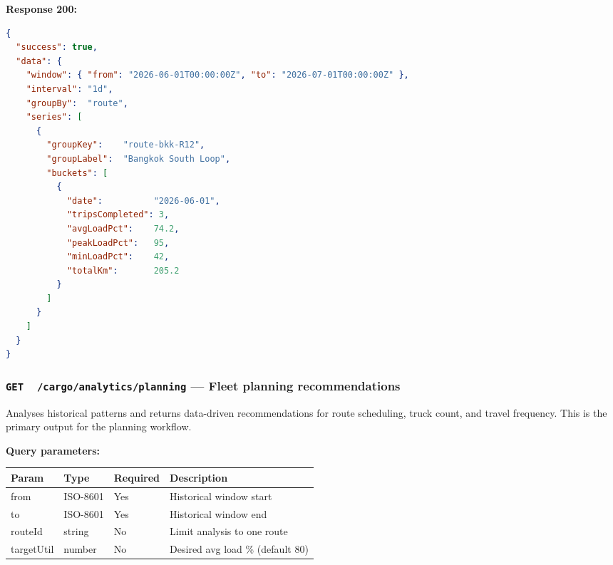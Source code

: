 \documentclass{article}
\newcommand{\GET}{\colorbox{evblue!20}{\texttt{\textbf{\color{evblue}GET}}}}
\begin{document}
\textbf{Response 200:}
\begin{lstlisting}[language=json, caption=Utilization analytics response]
{
  "success": true,
  "data": {
    "window": { "from": "2026-06-01T00:00:00Z", "to": "2026-07-01T00:00:00Z" },
    "interval": "1d",
    "groupBy":  "route",
    "series": [
      {
        "groupKey":    "route-bkk-R12",
        "groupLabel":  "Bangkok South Loop",
        "buckets": [
          {
            "date":          "2026-06-01",
            "tripsCompleted": 3,
            "avgLoadPct":    74.2,
            "peakLoadPct":   95,
            "minLoadPct":    42,
            "totalKm":       205.2
          }
        ]
      }
    ]
  }
}
\end{lstlisting}

\subsubsection{\GET\ \ \texttt{/cargo/analytics/planning} --- Fleet planning recommendations}

Analyses historical patterns and returns data-driven recommendations for
route scheduling, truck count, and travel frequency. This is the primary
output for the planning workflow.

\textbf{Query parameters:}

\begin{center}
\begin{tabular}{>{\ttfamily}llll}
\toprule
\textbf{Param} & \textbf{Type} & \textbf{Required} & \textbf{Description}\\
\midrule
from       & ISO-8601 & Yes & Historical window start\\
to         & ISO-8601 & Yes & Historical window end\\
routeId    & string   & No  & Limit analysis to one route\\
targetUtil & number   & No  & Desired avg load \% (default 80)\\
\bottomrule
\end{tabular}
\end{center}
\end{document}
